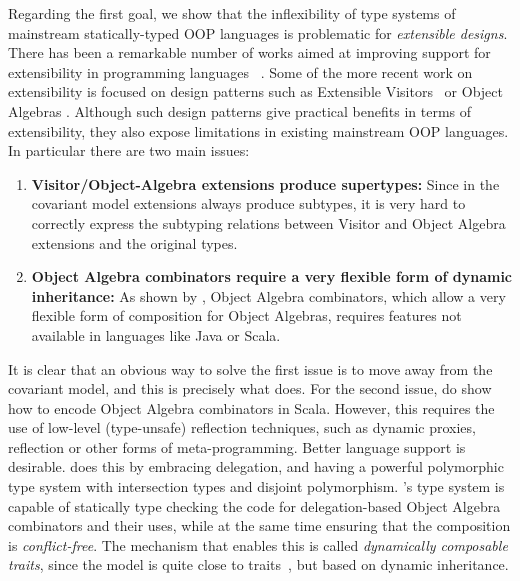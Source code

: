 Regarding the first goal, we show that the inflexibility of type systems of
mainstream statically-typed OOP languages is problematic for \emph{extensible
  designs}. There has been a remarkable number of works aimed at improving
support for extensibility in programming languages
~\cite{Prehofer97,Tarr99ndegrees,Harrison93subject,McDirmid01Jiazzi,Aracic06CaesarJ,Smaragdakis98mixin,nystrom2006j,togersen:2004,Zenger-Odersky2005,oliveira09modular,oliveira2012extensibility}.
Some of the more recent work on extensibility is focused on design patterns such
as Extensible Visitors~\cite{togersen:2004,oliveira09modular} or Object Algebras
\cite{oliveira2012extensibility}. Although such design patterns give practical
benefits in terms of extensibility, they also expose limitations in existing
mainstream OOP languages. In particular there are two main issues:

\begin{enumerate}

\item {\bf Visitor/Object-Algebra extensions produce supertypes:}
  Since in the covariant model extensions always produce subtypes, it
  is very hard to correctly express the subtyping relations between
  Visitor and Object Algebra extensions and the original types.

\item {\bf Object Algebra combinators require a very flexible form of
    dynamic inheritance:} As shown by \citet{oliveira2013feature,rendel14attributes}, Object Algebra
  combinators, which allow a very flexible form of composition for
  Object Algebras, requires features not available in languages like
  Java or Scala.

\end{enumerate}

It is clear that an obvious way to solve the first issue is to move away from
the covariant model, and this is precisely what \name does. For the second
issue, \citet{oliveira2013feature,rendel14attributes} do show how to encode
Object Algebra combinators in Scala. However, this requires the use of low-level
(type-unsafe) reflection techniques, such as dynamic proxies, reflection or
other forms of meta-programming. Better language support is desirable. \name
does this by embracing delegation, and having a powerful polymorphic type system
with intersection types and disjoint polymorphism. \name's type system is
capable of statically type checking the code for delegation-based Object Algebra
combinators and their uses, while at the same time ensuring that the composition
is \emph{conflict-free}. The mechanism that enables this is called
\emph{dynamically composable traits}, since the model is quite close to
traits~\cite{scharli2003traits}, but based on dynamic inheritance.

